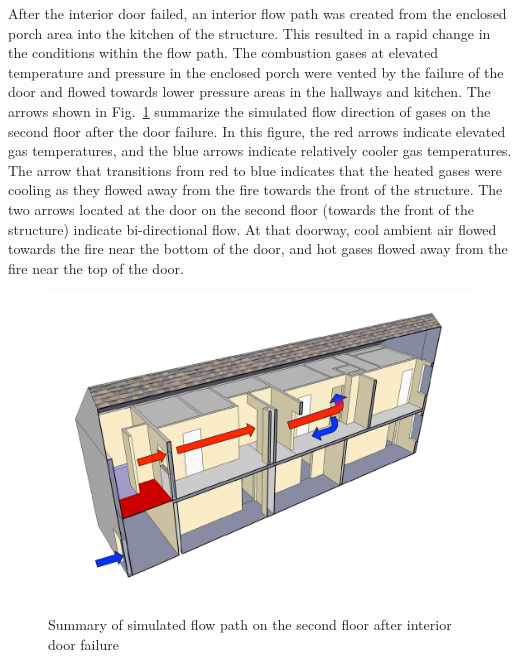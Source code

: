 After the interior door failed, an interior flow path was created from the enclosed porch area into the kitchen of the structure. This resulted in a rapid change in the conditions within the flow path. The combustion gases at elevated temperature and pressure in the enclosed porch were vented by the failure of the door and flowed towards lower pressure areas in the hallways and kitchen. The arrows shown in Fig.~\ref{fig:flowpath_1} summarize the simulated flow direction of gases on the second floor after the door failure. In this figure, the red arrows indicate elevated gas temperatures, and the blue arrows indicate relatively cooler gas temperatures. The arrow that transitions from red to blue indicates that the heated gases were cooling as they flowed away from the fire towards the front of the structure. The two arrows located at the door on the second floor (towards the front of the structure) indicate bi-directional flow. At that doorway, cool ambient air flowed towards the fire near the bottom of the door, and hot gases flowed away from the fire near the top of the door.

\begin{figure}[!ht]
\centering
\includegraphics[width=.7\textwidth]{../Figures/ChicagoFlow}
\caption{Summary of simulated flow path on the second floor after interior door failure}
\label{fig:flowpath_1}
\end{figure}

\clearpage

